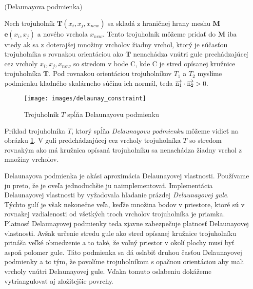 \begin{definition}
    (Delaunayova podmienka)
    \label{def:delaunay_constraint}

    Nech trojuholník $\mathbf{T}(x_i, x_j, x_{new})$ sa skladá z hraničnej hrany meshu $\mathbf{M}$ 
    $\mathbf{e}(x_i, x_j)$ a nového vrchola $x_{new}$. Tento trojuholník môžeme pridať do 
    $\mathbf{M}$ iba vtedy ak sa z doterajšej 
    množiny vrcholov žiadny vrchol, ktorý je súčasťou trojuholníka s rovnakou orientáciou ako 
    $\mathbf{T}$ nenachádza vnútri gule prechádzajúcej cez vrcholy $x_i, x_j, x_{new}$ so stredom 
    v bode C, kde C je stred opísanej kružnice trojuholníka $\mathbf{T}$. Pod rovnakou orientáciou 
    trojuholníkov $T_1$ a $T_2$ myslíme podmienku kladného skalárneho súčinu ich normál, teda 
    $\overrightarrow{\rm n_1} \cdot \overrightarrow{\rm n_2} > 0$.
\end{definition}

\begin{figure}
    \centerline{\texttt{[image: images/delaunay\_constraint]}}
    \caption[\cite{hilton1996marching} Trojuholník $T$ spĺňa Delaunayovu podmienku]{\cite{hilton1996marching} Trojuholník $T$ spĺňa Delaunayovu podmienku}
    \label{obr:delaunay_constraint}
\end{figure}

Príklad trojuholníka $T$, ktorý spĺňa \textit{Delaunayovu podmienku} môžeme vidieť na obrázku 
\ref{obr:delaunay_constraint}. V guli predchádzajúcej cez vrcholy trojuholníka $T$ so stredom 
rovnakým ako má kružnica opísaná trojuholníku sa nenachádza žiadny vrchol z množiny vrcholov.

Delaunayova podmienka je akási aproximácia Delaunayovej vlastnosti. Používame ju preto, že 
je oveľa jednoduchšie ju naimplementovať. Implementácia Delaunayovej vlastnosti by vyžadovala
hľadanie prázdej \textit{Delaunayovej gule}. Týchto gulí je však nekonečne veľa, keďže množina
bodov v priestore, ktoré sú v rovnakej vzdialenosti od všetkých troch vrcholov trojuholníka je priamka.
Platnosť Delaunayovej podmienky teda zjavne zabezpečuje platnosť Delaunayovej vlastnosti.
Avšak určenie stredu gule ako stred opísanej kružnice trojuholníku prináša veľké obmedzenie a to také,
že voľný priestor v okolí plochy musí byť aspoň polomer gule. Táto podmienka sa dá oslabiť druhou časťou
Delaunayovej podmienky a to tým, že povolíme trojuholníkom s opačnou orientáciou aby mali vrcholy vnútri
Delaunayovej gule. Vďaka tomuto oslabeniu dokážeme vytriangulovať aj zložitejšie povrchy.



